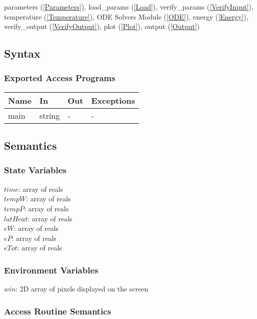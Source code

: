 \documentclass[12pt]{article}
\begin{document}
parameters (\ref{Parameters}), load\_params (\ref{Load}), verify\_params
(\ref{VerifyInput}), temperature (\ref{Temperature}), ODE Solvers Module
(\ref{ODE}), energy (\ref{Energy}), verify\_output (\ref{VerifyOutput}), plot
(\ref{Plot}), output (\ref{Output})

\subsection{Syntax}

\subsubsection{Exported Access Programs}

\begin{center}
\begin{tabular}{p{2cm} p{4cm} p{4cm} p{2cm}}
\hline
\textbf{Name} & \textbf{In} & \textbf{Out} & \textbf{Exceptions} \\
\hline
main & string & - & - \\
\hline
\end{tabular}
\end{center}

\subsection{Semantics}

\subsubsection{State Variables}

$time$: array of reals \\
$tempW$: array of reals \\
$tempP$: array of reals \\
$latHeat$: array of reals \\
$eW$: array of reals \\
$eP$: array of reals \\ 
$eTot$: array of reals

\subsubsection{Environment Variables}

$win$: 2D array of pixels displayed on the screen

\subsubsection{Access Routine Semantics}
\end{document}
